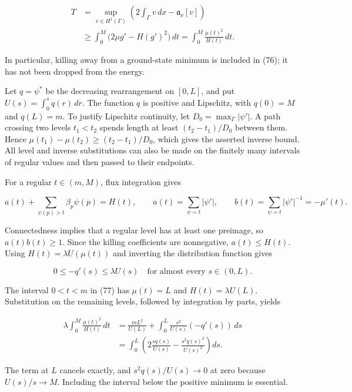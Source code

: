\documentclass[11pt]{article}
\begin{document}
\[
\begin{aligned}
T&=\sup_{v\in H^1(\Gamma)}
 \left(2\int_\Gamma v\,dx-\mathfrak a_\nu[v]\right)\\
&\ge\int_0^M\bigl(2\mu g'-H(g')^2\bigr)\,dt
 =\int_0^M\frac{\mu(t)^2}{H(t)}\,dt.
\end{aligned}
\tag{77}
\]

In particular, killing away from a ground-state minimum is included in
(76); it has not been dropped from the energy.

Let \(q=\psi^*\) be the decreasing rearrangement on \([0,L]\), and put
\(U(s)=\int_0^s q(r)\,dr\). The function \(q\) is positive and
Lipschitz, with \(q(0)=M\) and \(q(L)=m\). To justify Lipschitz
continuity, let \(D_0=\max_\Gamma|\psi'|\). A path crossing two levels
\(t_1<t_2\) spends length at least \((t_2-t_1)/D_0\) between them. Hence
\(\mu(t_1)-\mu(t_2)\ge(t_2-t_1)/D_0\), which gives the asserted inverse
bound. All level and inverse substitutions can also be made on the
finitely many intervals of regular values and then passed to their
endpoints.

For a regular \(t\in(m,M)\), flux integration gives

\[
a(t)+\sum_{\psi(p)>t}\beta_p\psi(p)=H(t),
\qquad
 a(t)=\sum_{\psi=t}|\psi'|,\qquad
 b(t)=\sum_{\psi=t}|\psi'|^{-1}=-\mu'(t).
\tag{78}
\]

Connectedness implies that a regular level has at least one preimage, so
\(a(t)b(t)\ge1\). Since the killing coefficients are nonnegative,
\(a(t)\le H(t)\). Using \(H(t)=\lambda U(\mu(t))\) and inverting the
distribution function gives

\[
0\le-q'(s)\le\lambda U(s)\quad\text{for almost every }s\in(0,L).
\tag{79}
\]

The interval \(0<t<m\) in (77) has \(\mu(t)=L\) and
\(H(t)=\lambda U(L)\). Substitution on the remaining levels, followed by
integration by parts, yields

\[
\begin{aligned}
\lambda\int_0^M\frac{\mu(t)^2}{H(t)}\,dt
&=\frac{mL^2}{U(L)}
   +\int_0^L\frac{s^2}{U(s)}(-q'(s))\,ds\\
&=\int_0^L\left(2\frac{s q(s)}{U(s)}
             -\frac{s^2q(s)^2}{U(s)^2}\right)ds.
\end{aligned}
\tag{80}
\]

The term at \(L\) cancels exactly, and \(s^2q(s)/U(s)\to0\) at zero
because \(U(s)/s\to M\). Including the interval below the positive
minimum is essential.
\end{document}

